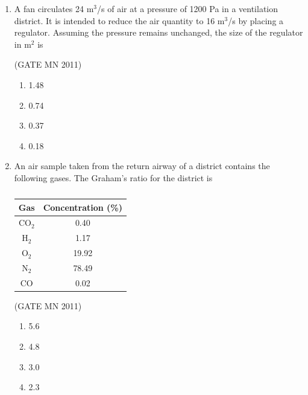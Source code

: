 \documentclass[journal]{IEEEtran}
\begin{document}
\begin{enumerate}
\hfill(GATE MN 2011)
\begin{multicols}{4}
\begin{enumerate}
  \item 57.6
  \item 43.2
  \item 39.06
  \item 37.7
\end{enumerate}
\end{multicols}

\item A fan circulates 24 m$^3$/s of air at a pressure of 1200 Pa in a ventilation district. 
It is intended to reduce the air quantity to 16 m$^3$/s by placing a regulator. 
Assuming the pressure remains unchanged, the size of the regulator in m$^2$ is

\hfill(GATE MN 2011)
\begin{multicols}{4}
\begin{enumerate}
  \item 1.48
  \item 0.74
  \item 0.37
  \item 0.18
\end{enumerate}
\end{multicols}

\item An air sample taken from the return airway of a district contains the following gases. 
The Graham’s ratio for the district is

\begin{table}[H]
    \centering\normalsize
\begin{tabular}{|c|c|}
\hline
Gas & Concentration (\%) \\ \hline
CO$_2$ & 0.40 \\ \hline
H$_2$ & 1.17 \\ \hline
O$_2$ & 19.92 \\ \hline
N$_2$ & 78.49 \\ \hline
CO & 0.02 \\ \hline
\end{tabular}

\caption{}
    \label{tab:Q41}
\end{table}


\hfill(GATE MN 2011)
\begin{multicols}{4}
\begin{enumerate}
  \item 5.6
  \item 4.8
  \item 3.0
  \item 2.3
\end{enumerate}
\end{multicols}


\end{enumerate}
\end{document}
